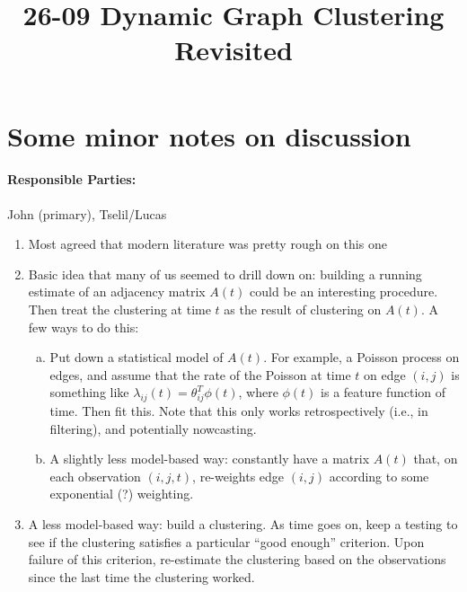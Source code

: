 \documentclass[11pt]{article}
\begin{document}
\title{26-09 Dynamic Graph Clustering Revisited}

\maketitle

\section{Some minor notes on discussion}

\paragraph{Responsible Parties:} John (primary), Tselil/Lucas

\begin{enumerate}[1.]
\item Most agreed that modern literature was pretty rough on this one
\item Basic idea that many of us seemed to drill down on: building a running
  estimate of an adjacency matrix $A(t)$ could be an interesting
  procedure.
  Then treat the clustering at time $t$ as the result of clustering on $A(t)$.
  A few ways to do this:
  \begin{enumerate}[a.]
  \item Put down a statistical model of $A(t)$.
    For example, a Poisson process on edges, and assume that the rate
    of the Poisson at time $t$ on edge $(i, j)$ is something like
    $\lambda_{ij}(t) = \theta_{ij}^T \phi(t)$, where $\phi(t)$ is a feature
    function of time.
    Then fit this.
    Note that this only works retrospectively (i.e., in filtering), and
    potentially nowcasting.
  \item A slightly less model-based way: constantly have a matrix
    $A(t)$ that, on each observation $(i, j, t)$, re-weights edge
    $(i ,j)$ according to some exponential (?) weighting.
  \end{enumerate}
\item A less model-based way: build a clustering.
  As time goes on, keep a testing to see if the clustering satisfies a
  particular ``good enough'' criterion.
  Upon failure of this criterion, re-estimate the clustering based on the
  observations since the last time the clustering worked.
\end{enumerate}
\end{document}

